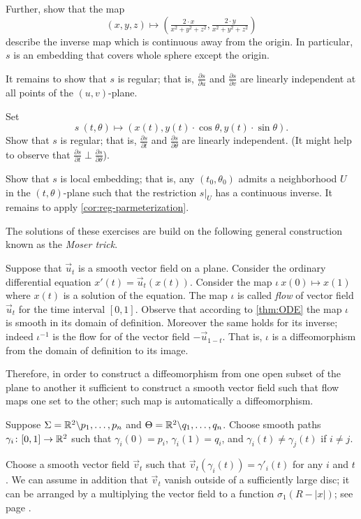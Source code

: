 Further, show that the map 
\[(x,y,z)\mapsto (\tfrac{2\cdot x}{x^2+y^2+z^2},\tfrac{2\cdot y}{x^2+y^2+z^2})\]
describe the inverse map which is continuous away from the origin.
In particular, $s$ is an embedding that covers whole sphere except the origin.

It remains to show that $s$ is regular; that is, $\tfrac{\partial s}{\partial u}$ and $\tfrac{\partial s}{\partial v}$ are linearly independent at all points of the $(u,v)$-plane.

Set
\[s\:(t,\theta)\mapsto (x(t), y(t)\cdot\cos\theta,y(t)\cdot\sin\theta).\]
Show that $s$ is regular; that is, $\tfrac{\partial s}{\partial t}$ and $\tfrac{\partial s}{\partial \theta}$ are linearly independent.
(It might help to observe that $\tfrac{\partial s}{\partial t}\perp\tfrac{\partial s}{\partial \theta}$).

Show that $s$ is local embedding; that is, any $(t_0,\theta_0)$ admits a neighborhood $U$ in the $(t,\theta)$-plane such that the restriction $s|_U$ has a continuous inverse.
It remains to apply \ref{cor:reg-parmeterization}.

The solutions of these exercises are build on the following general construction known as the \emph{Moser trick}.

Suppose that $\vec u_t$ is a smooth vector field on a plane.
Consider the ordinary differential equation $x'(t)=\vec u_t(x(t))$.
Consider the map $\iota\:x(0)\mapsto x(1)$ where $x(t)$ is a solution of the equation.
The map $\iota$ is called \emph{flow} of vector field $\vec u_t$ for the time interval $[0,1]$.
Observe that according to \ref{thm:ODE} the map $\iota$ is smooth in its domain of definition.
Moreover the same holds for its inverse;
indeed $\iota^{-1}$ is the flow for of the vector field $-\vec u_{1-t}$.
That is, $\iota$ is a diffeomorphism from the domain of definition to its image. 


Therefore, in order to construct a diffeomorphism from one open subset of the plane to another it sufficient to construct a smooth vector field such that flow maps one set to the other;
such map is automatically a diffeomorphism.


Suppose $\Sigma=\mathbb{R}^2\backslash{p_1,\dots,p_n}$ and $\Theta=\mathbb{R}^2\backslash{q_1,\dots,q_n}$.
Choose smooth paths $\gamma_i\colon[0,1]\to \mathbb{R}^2$ such that $\gamma_i(0)=p_i$,
$\gamma_i(1)=q_i$, and $\gamma_i(t)\ne \gamma_j(t)$ if $i\ne j$.

Choose a smooth vector field $\vec v_t$ such that $\vec v_t(\gamma_i(t))=\gamma'_i(t)$ for any $i$ and $t$.
We can assume in addition that $\vec v_t$ vanish outside of a sufficiently large disc; it can be arranged by a multiplying the vector field to a function 
$\sigma_1(R-|x|)$; see page \pageref{page:sigma-function}.

